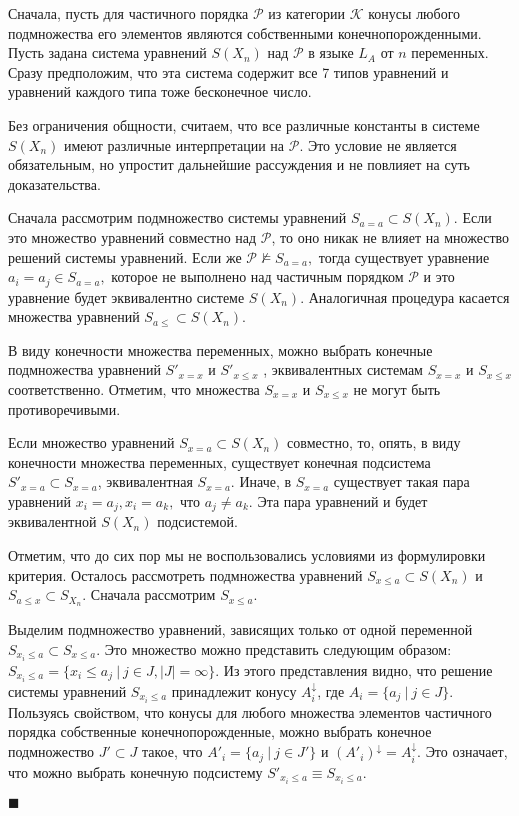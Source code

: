 \documentclass[12pt]{article}
\theoremstyle{break}
\newenvironment{Proof} %
	{\par\noindent{\bf Доказательство.}} %
	{\hfill$\scriptstyle\blacksquare$} %
\def\P{\mathcal{P}}
\begin{document}
		\begin{Proof}
			Сначала, пусть для частичного порядка $\P$ из категории $\mathcal{K}$ конусы любого подмножества его элементов являются собственными конечнопорожденными. Пусть задана система уравнений $S(X_n)$ над $\P$ в языке $L_A$ от $n$ переменных. Сразу предположим, что эта система содержит все 7 типов уравнений и уравнений каждого типа тоже бесконечное число.

			Без ограничения общности, считаем, что все различные константы в системе $S(X_n)$ имеют различные интерпретации на $\P$. Это условие не является обязательным, но упростит дальнейшие рассуждения и не повлияет на суть доказательства.

			Сначала рассмотрим подмножество системы уравнений $S_{a=a}\subset S(X_n)$. Если это множество уравнений совместно над $\P$, то оно никак не влияет на множество решений системы уравнений. Если же $\P\nvDash S_{a=a},$ тогда существует уравнение $a_i=a_j\in S_{a=a},$ которое не выполнено над частичным порядком $\P$ и это уравнение будет эквивалентно системе $S(X_n).$ Аналогичная процедура касается множества уравнений $S_{a\leqslant}\subset S(X_n).$

			В виду конечности множества переменных, можно выбрать конечные подмножества уравнений $S'_{x=x}$ и $S'_{x\leqslant x}$ , эквивалентных системам $S_{x=x}$ и $S_{x\leqslant x}$ соответственно. Отметим, что множества $S_{x=x}$ и $S_{x\leqslant x}$ не могут быть противоречивыми.

			Если множество уравнений $S_{x=a}\subset S(X_n)$ совместно, то, опять, в виду конечности множества переменных, существует конечная подсистема $S'_{x=a}\subset S_{x=a}$, эквивалентная $S_{x=a}.$ Иначе, в $S_{x=a}$  существует такая пара уравнений $x_i=a_j, x_i=a_k,$ что $a_j\neq a_k$. Эта пара уравнений и будет эквивалентной $S(X_n)$ подсистемой.

			Отметим, что до сих пор мы не воспользовались условиями из формулировки критерия. Осталось рассмотреть подмножества уравнений $S_{x\leqslant a}\subset S(X_n)$ и $S_{a\leqslant x}\subset S_{X_n}$. Сначала рассмотрим $S_{x\leqslant a}$.

			Выделим подмножество уравнений, зависящих только от одной переменной $S_{x_i\leqslant a}\subset S_{x\leqslant a}$. Это множество можно представить следующим образом: $S_{x_i\leqslant a}=\{x_i\leqslant a_j\ |\ j\in J, |J| = \infty\}.$ Из этого представления видно, что решение системы уравнений $S_{x_i\leqslant a}$ принадлежит конусу $A_i^{\downarrow}$, где $A_i = \{a_j\ |\ j\in J\}$. Пользуясь свойством, что конусы для любого множества элементов частичного порядка собственные конечнопорожденные, можно выбрать конечное подмножество $J'\subset J$ такое, что $A'_i = \{a_j\ |\ j\in J'\}$ и $(A'_i)^{\downarrow} = A_i^{\downarrow}.$ Это означает, что можно выбрать конечную подсистему $S'_{x_i\leqslant a}\equiv S_{x_i\leqslant a}$.


\end{Proof}
\end{document}
